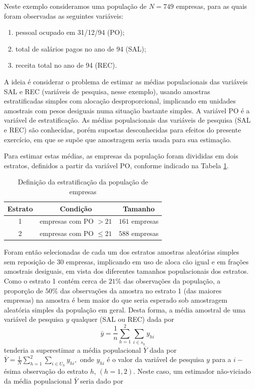 \documentclass[]{book}
\numberwithin{example}{chapter}
\numberwithin{remark}{chapter}
\numberwithin{definition}{chapter}
\begin{document}
Neste exemplo consideramos uma população de \(N=749\) empresas, para as
quais foram observadas as seguintes variáveis:

\begin{enumerate}
\def\labelenumi{\arabic{enumi}.}
\item
  pessoal ocupado em 31/12/94 (PO);
\item
  total de salários pagos no ano de 94 (SAL);
\item
  receita total no ano de 94 (REC).
\end{enumerate}

A ideia é considerar o problema de estimar as médias populacionais das
variáveis SAL e REC (variáveis de pesquisa, nesse exemplo), usando
amostras estratificadas simples com alocação desproporcional, implicando
em unidades amostrais com pesos desiguais numa situação bastante
simples. A variável PO é a variável de estratificação. As médias
populacionais das variáveis de pesquisa (SAL e REC) são conhecidas,
porém supostas desconhecidas para efeitos do presente exercício, em que
se supõe que amostragem seria usada para sua estimação.

Para estimar estas médias, as empresas da população foram divididas em
dois estratos, definidos a partir da variável PO, conforme indicado na
Tabela \ref{tab42}.

\begin{center}
\begin{table}[tbp] \centering
\caption{Definição da estratificação da população de empresas}\bigskip \label{tab42} 
\begin{tabular}{|c|c|c|}
\hline
Estrato & Condição & Tamanho \\ \hline
1 & empresas com PO  $>21$ & $161$ empresas \\ \hline
2 & empresas com PO $\leq21$ & $588$ empresas \\ \hline
\end{tabular}
\end{table}
\end{center}

Foram então selecionadas de cada um dos estratos amostras aleatórias
simples sem reposição de \(30\) empresas, implicando em uso de aloca\c{%
c}ão igual e em frações amostrais desiguais, em vista dos diferentes
tamanhos populacionais dos estratos. Como o estrato 1 contém cerca de
\(21\%\) das observações da população, a proporção de \(50\%\) das
observações da amostra no estrato 1 (das maiores empresas) na amostra é
bem maior do que seria esperado sob amostragem aleatória simples da
população em geral. Desta forma, a média amostral de uma variável de
pesquisa \(y\) qualquer (SAL ou REC) dada por \[
\bar{y}=\frac{1}{n}\sum\limits_{h=1}^{2}\sum\limits_{i\in s_{h}}y_{hi} \]
tenderia a superestimar a média populacional \(\overline{Y}\) dada por
\(\overline{Y}=\frac{1}{N}\sum\limits_{h=1}^{2}\sum_{i\in U_{h}}y_{hi},\)
onde \(y_{hi}\) é o valor da variável de pesquisa \(y\) para a
\(i-\)ésima observação do estrato \(h\), \((h=1,2)\). Neste caso, um
estimador não-viciado da média populacional \(\bar{Y}\) seria dado por
\end{document}
